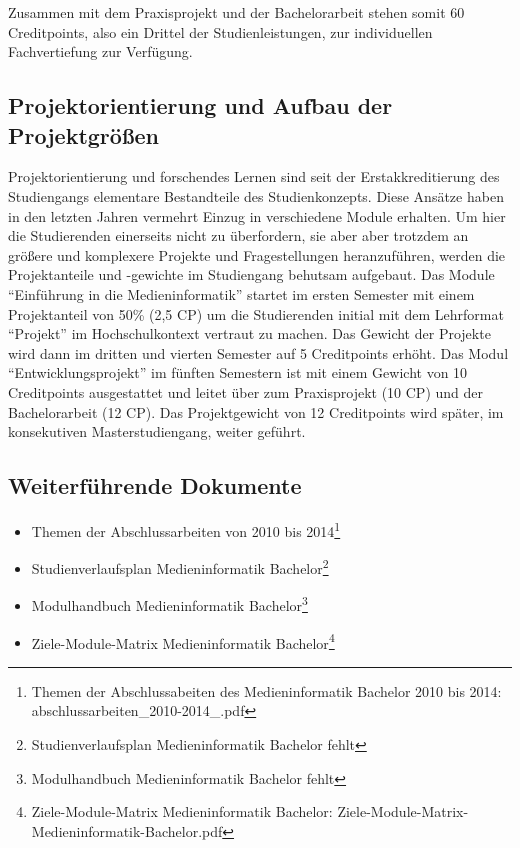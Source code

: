 Zusammen mit dem Praxisprojekt und der Bachelorarbeit stehen somit 60
Creditpoints, also ein Drittel der Studienleistungen, zur individuellen
Fachvertiefung zur Verfügung.

\subsection{Projektorientierung und Aufbau der
Projektgrößen}\label{projektorientierung-und-aufbau-der-projektgruxf6uxdfen}

Projektorientierung und forschendes Lernen sind seit der
Erstakkreditierung des Studiengangs elementare Bestandteile des
Studienkonzepts. Diese Ansätze haben in den letzten Jahren vermehrt
Einzug in verschiedene Module erhalten. Um hier die Studierenden
einerseits nicht zu überfordern, sie aber aber trotzdem an größere und
komplexere Projekte und Fragestellungen heranzuführen, werden die
Projektanteile und -gewichte im Studiengang behutsam aufgebaut. Das
Module ``Einführung in die Medieninformatik'' startet im ersten Semester
mit einem Projektanteil von 50\% (2,5 CP) um die Studierenden initial
mit dem Lehrformat ``Projekt'' im Hochschulkontext vertraut zu machen.
Das Gewicht der Projekte wird dann im dritten und vierten Semester auf 5
Creditpoints erhöht. Das Modul ``Entwicklungsprojekt'' im fünften
Semestern ist mit einem Gewicht von 10 Creditpoints ausgestattet und
leitet über zum Praxisprojekt (10 CP) und der Bachelorarbeit (12 CP).
Das Projektgewicht von 12 Creditpoints wird später, im konsekutiven
Masterstudiengang, weiter geführt.

\subsection{Weiterführende
Dokumente}\label{weiterfuxfchrende-dokumente-2}

\begin{itemize}
\tightlist
\item
  Themen der Abschlussarbeiten von 2010 bis 2014\footnote{Themen der
    Abschlussabeiten des Medieninformatik Bachelor 2010 bis 2014:
    abschlussarbeiten\_2010-2014\_.pdf}
\item
  Studienverlaufsplan Medieninformatik Bachelor\footnote{Studienverlaufsplan
    Medieninformatik Bachelor fehlt}
\item
  Modulhandbuch Medieninformatik Bachelor\footnote{Modulhandbuch
    Medieninformatik Bachelor fehlt}
\item
  Ziele-Module-Matrix Medieninformatik Bachelor\footnote{Ziele-Module-Matrix
    Medieninformatik Bachelor:
    Ziele-Module-Matrix-Medieninformatik-Bachelor.pdf}
\end{itemize}

